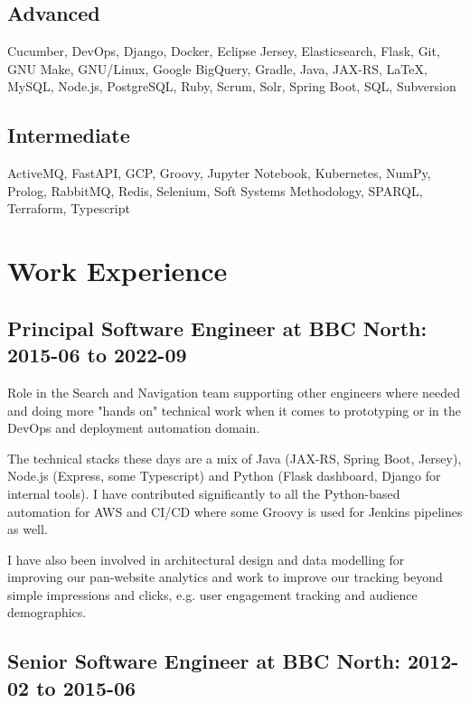 \documentclass[10pt]{article}
\begin{document}
\subsection*{Advanced}

Cucumber, DevOps, Django, Docker, Eclipse Jersey, Elasticsearch, Flask, Git, GNU Make, GNU/Linux, Google BigQuery, Gradle, Java, JAX-RS, LaTeX, MySQL, Node.js, PostgreSQL, Ruby, Scrum, Solr, Spring Boot, SQL, Subversion

\subsection*{Intermediate}

ActiveMQ, FastAPI, GCP, Groovy, Jupyter Notebook, Kubernetes, NumPy, Prolog, RabbitMQ, Redis, Selenium, Soft Systems Methodology, SPARQL, Terraform, Typescript


\vfill

\section*{Work Experience}



\subsection*{Principal Software Engineer at BBC North: 2015-06 to 2022-09}


Role in the Search and Navigation team supporting other engineers where needed
and doing more "hands on" technical work when it comes to prototyping
or in the DevOps and deployment automation domain.

The technical stacks these days are a mix of Java (JAX-RS, Spring Boot, Jersey),
Node.js (Express, some Typescript) and Python (Flask dashboard, Django for
internal tools).
I have contributed significantly to all the Python-based
automation for AWS and CI/CD where some Groovy is used for Jenkins pipelines
as well.

I have also been involved in architectural design and data modelling for
improving our pan-website analytics and work to improve our tracking beyond
simple impressions and clicks, e.g. user engagement tracking and audience
demographics.




\subsection*{Senior Software Engineer at BBC North: 2012-02 to 2015-06}
\end{document}

